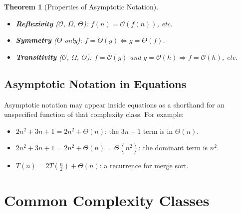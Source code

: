 \documentclass[11pt, a4paper, notitlepage]{report}
\newtheorem{theorem}{Theorem}[section]
\theoremstyle{definition}
\theoremstyle{remark}
\theoremstyle{definition}
\begin{document}
\begin{theorem}[Properties of Asymptotic Notation]
\label{thm:asym-properties}
\leavevmode
\begin{itemize}
  \item \textbf{Reflexivity} ($\mathcal{O}$, $\Omega$, $\Theta$):
        $f(n) = \mathcal{O}(f(n))$, etc.
  \item \textbf{Symmetry} ($\Theta$ only):
        $f = \Theta(g) \Leftrightarrow g = \Theta(f)$.
  \item \textbf{Transitivity} ($\mathcal{O}$, $\Omega$, $\Theta$):
        $f = \mathcal{O}(g)$ and $g = \mathcal{O}(h) \Rightarrow f = \mathcal{O}(h)$, etc.
\end{itemize}
\end{theorem}

\subsection{Asymptotic Notation in Equations}
\label{subsec:asym-in-eqns}

Asymptotic notation may appear inside equations as a shorthand for an
unspecified function of that complexity class.  For example:
\begin{itemize}
  \item $2n^2 + 3n + 1 = 2n^2 + \Theta(n)$: the $3n+1$ term is in $\Theta(n)$.
  \item $2n^2 + 3n + 1 = 2n^2 + \Theta(n) = \Theta(n^2)$: the dominant term is $n^2$.
  \item $T(n) = 2T\!\left(\tfrac{n}{2}\right) + \Theta(n)$: a recurrence for merge sort.
\end{itemize}

\section{Common Complexity Classes}
\label{sec:complexity-classes}
\end{document}
